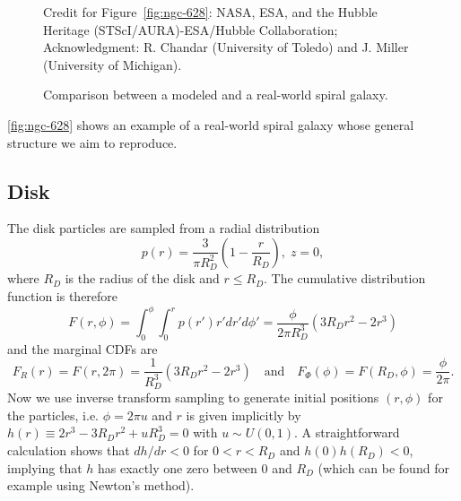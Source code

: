 \begin{figure}[htp]
    \vspace{0.5em}
    {\footnotesize
        Credit for Figure~\ref{fig:ngc-628}: NASA, ESA, and the Hubble Heritage (STScI/AURA)-ESA/Hubble Collaboration;
        Acknowledgment: R. Chandar (University of Toledo) and J. Miller (University of Michigan). \par}

    \caption{Comparison between a modeled and a real-world spiral galaxy.}
    \label{fig:galaxy-comparison}
\end{figure}
\autoref{fig:ngc-628} shows an example of a real-world spiral galaxy whose general structure we aim to reproduce.

\subsection{Disk}\label{subsec:disk}
The disk particles are sampled from a radial distribution
\begin{equation*}
    p(r) = \frac{3}{\pi R_D^2}\left(1 - \frac{r}{R_D}\right), \; z = 0,
\end{equation*}
where $R_D$ is the radius of the disk and $r \leq R_D$.
The cumulative distribution function is therefore
\begin{equation*}
    F(r, \phi) = \int_{0}^{\phi}\int_{0}^{r} p(r') r'dr'd\phi' = \frac{\phi}{2\pi R_D^3}(3R_D r^2-2r^3)
\end{equation*}
and the marginal CDFs are
\begin{equation*}
    F_R(r) = F(r, 2\pi) = \frac{1}{R_D^3}(3R_D r^2-2r^3) \quad \text{and} \quad F_\Phi(\phi) = F(R_D, \phi) = \frac{\phi}{2\pi}.
\end{equation*}
Now we use inverse transform sampling to generate initial positions $(r, \phi)$ for the particles, i.e. $\phi = 2\pi u$ and $r$ is given implicitly by $h(r) \equiv 2r^3 - 3R_D r^2 + uR_D^3 = 0$ with $u \sim U(0, 1)$.
A straightforward calculation shows that $dh/dr < 0$ for $0 < r < R_D$ and $h(0)h(R_D) < 0$, implying that $h$ has exactly one zero between 0 and $R_D$ (which can be found for example using Newton's method).


